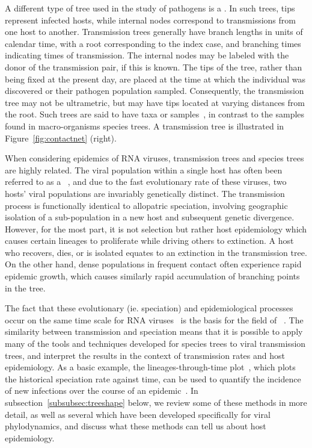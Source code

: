 A different type of tree used in the study of pathogens is a . In such trees, tips represent infected hosts, while internal nodes
correspond to transmissions from one host to another. Transmission trees
generally have branch lengths in units of calendar time, with a root
corresponding to the index case, and branching times indicating times of
transmission. The internal nodes may be labeled with the donor of the
transmission pair, if this is known. The tips of the tree, rather than being
fixed at the present day, are placed at the time at which the individual was
discovered or their pathogen population sampled. Consequently, the transmission
tree may not be ultrametric, but may have tips located at varying distances
from the root. Such trees are said to have  taxa or
samples~\autocite{drummond2003measurably}, in contrast to the
 samples found in macro-organisms species trees. A
transmission tree is illustrated in Figure~\ref{fig:contactnet} (right).

When considering epidemics of RNA viruses, transmission trees and species trees
are highly related. The viral population within a single host has often been
referred to as a ~\autocite{domingo2012viral}, and due to
the fast evolutionary rate of these viruses, two hosts' viral populations are
invariably genetically distinct. The transmission process is functionally
identical to allopatric speciation, involving geographic isolation of a
sub-population in a new host and subsequent genetic divergence. However, for
the most part, it is not selection but rather host epidemiology which causes
certain lineages to proliferate while driving others to extinction. A host who
recovers, dies, or is isolated equates to an extinction in the transmission
tree. On the other hand, dense populations in frequent contact often experience
rapid epidemic growth, which causes similarly rapid accumulation of branching
points in the tree. 

The fact that these evolutionary (ie. speciation) and epidemiological processes
occur on the same time scale for RNA viruses~\autocite{drummond2003measurably}
is the basis for the field of
~\autocite{grenfell2004unifying}. The similarity between
transmission and speciation means that it is possible to apply many of the
tools and techniques developed for species trees to viral transmission trees,
and interpret the results in the context of transmission rates and host
epidemiology. As a basic example, the lineages-through-time
plot~\autocite{nee1992tempo}, which plots the historical speciation rate
against time, can be used to quantify the incidence of new infections over the
course of an epidemic~\autocite{holmes1995revealing}. In
subsection~\ref{subsubsec:treeshape} below, we review some of these methods in
more detail, as well as several which have been developed specifically for
viral phylodynamics, and discuss what these methods can tell us about host
epidemiology.

